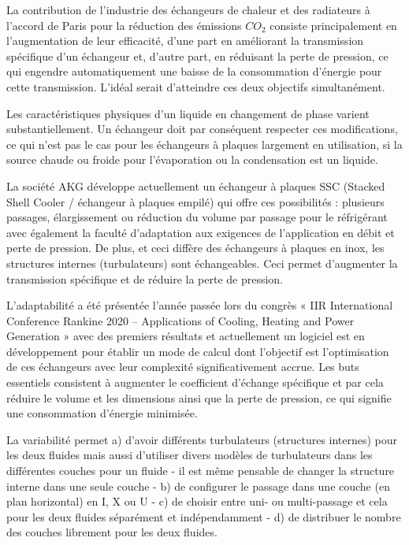 {\normalsize
La contribution de l'industrie des échangeurs de chaleur et des radiateurs à l'accord de Paris pour la réduction des émissions $\unit{CO_2}$ consiste principalement en l'augmentation de leur efficacité, d'une part en améliorant la transmission spécifique d'un échangeur et, d'autre part, en réduisant la perte de pression, ce qui engendre automatiquement une baisse de la consommation d'énergie pour cette transmission. L'idéal serait d'atteindre ces deux objectifs simultanément.



Les caractéristiques physiques d'un liquide en changement de phase varient substantiellement. Un échangeur doit par conséquent respecter ces modifications, ce qui n'est pas le cas pour les échangeurs à plaques largement en utilisation, si la source chaude ou froide pour l'évaporation ou la condensation est un liquide.



La société AKG développe actuellement un échangeur à plaques SSC (Stacked Shell Cooler / échangeur à plaques empilé) qui offre ces possibilités : plusieurs passages, élargissement ou réduction du volume par passage pour le réfrigérant avec également la faculté d'adaptation aux exigences de l'application en débit et perte de pression. De plus, et ceci diffère des échangeurs à plaques en inox, les structures internes (turbulateurs) sont échangeables. Ceci permet d'augmenter la transmission spécifique et de réduire la perte de pression.



L'adaptabilité a été présentée l'année passée lors du congrès « IIR International Conference Rankine 2020 – Applications of Cooling, Heating and Power Generation » avec des premiers résultats et actuellement un logiciel est en développement pour établir un mode de calcul dont l'objectif est l'optimisation de ces échangeurs avec leur complexité significativement accrue. Les buts essentiels consistent à augmenter le coefficient d'échange spécifique et par cela réduire le volume et les dimensions ainsi que la perte de pression, ce qui signifie une consommation d'énergie minimisée.



La variabilité permet a) d'avoir différents turbulateurs (structures internes) pour les deux fluides mais aussi d'utiliser divers modèles de turbulateurs dans les différentes couches pour un fluide - il est même pensable de changer la structure interne dans une seule couche - b) de configurer le passage dans une couche (en plan horizontal) en I, X ou U - c) de choisir entre uni- ou multi-passage et cela pour les deux fluides séparément et indépendamment - d) de distribuer le nombre des couches librement pour les deux fluides.



}
